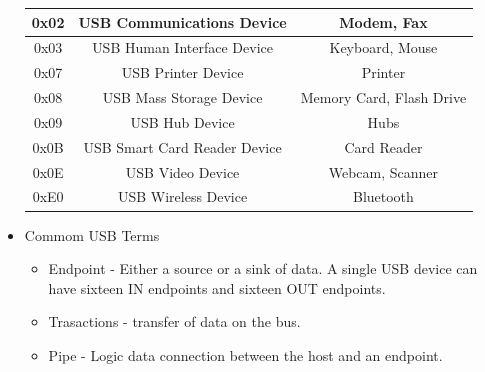 \documentclass{article}
\begin{document}
\begin{itemize}
\begin{table}[H]
\begin{tabular}{|c|c|c|}
                  \hline
                  0x02                  & USB Communications Device    & Modem, Fax               \\
                  \hline
                  0x03                  & USB Human Interface Device   & Keyboard, Mouse          \\
                  \hline
                  0x07                  & USB Printer Device           & Printer                  \\
                  \hline
                  0x08                  & USB Mass Storage Device      & Memory Card, Flash Drive \\
                  \hline
                  0x09                  & USB Hub Device               & Hubs                     \\
                  \hline
                  0x0B                  & USB Smart Card Reader Device & Card Reader              \\
                  \hline
                  0x0E                  & USB Video Device             & Webcam, Scanner          \\
                  \hline
                  0xE0                  & USB Wireless Device          & Bluetooth                \\
                  \hline
              \end{tabular}
          \end{table}
    \item Commom USB Terms
          \begin{itemize}
              \item Endpoint -  Either a source or a sink of data. A single USB device can have sixteen IN endpoints and sixteen OUT endpoints.
              \item Trasactions - transfer of data on the bus.
              \item Pipe - Logic data connection between the host and an endpoint.
          \end{itemize}
\end{itemize}
\end{document}

